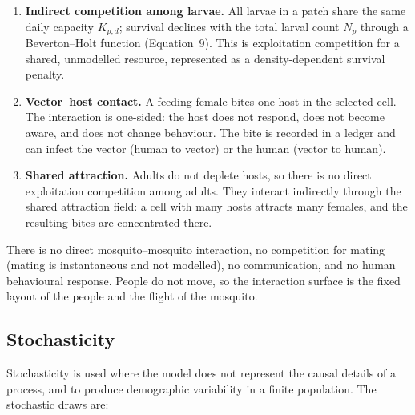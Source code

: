 \documentclass[11pt,a4paper]{article}
\begin{document}
\begin{enumerate}
\item \textbf{Indirect competition among larvae.} All larvae in a patch
  share the same daily capacity $K_{p,d}$; survival declines with the
  total larval count $N_p$ through a Beverton--Holt function
  (Equation~9). This is exploitation competition for a shared,
  unmodelled resource, represented as a density-dependent survival
  penalty.
\item \textbf{Vector--host contact.} A feeding female bites one host in
  the selected cell. The interaction is one-sided: the host does not
  respond, does not become aware, and does not change behaviour. The bite
  is recorded in a ledger and can infect the vector (human to vector) or
  the human (vector to human).
\item \textbf{Shared attraction.} Adults do not deplete hosts, so there
  is no direct exploitation competition among adults. They interact
  indirectly through the shared attraction field: a cell with many hosts
  attracts many females, and the resulting bites are concentrated there.
\end{enumerate}

There is no direct mosquito--mosquito interaction, no competition for
mating (mating is instantaneous and not modelled), no communication, and
no human behavioural response. People do not move, so the interaction surface is the fixed layout of
the people and the flight of the mosquito.

\subsection{Stochasticity}

Stochasticity is used where the model does not represent the causal
details of a process, and to produce demographic variability in a
finite population. The stochastic draws are:
\end{document}
